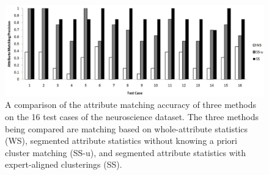 \begin{figure}[tb]
\begin{center}
\includegraphics[width=1.\textwidth]{fig/perf_comp.eps}
\end{center}
\caption[A comparison between methods on the neuroscience dataset]{\label{fig:perf_comp} A comparison of the attribute matching accuracy of three methods on the 16 test cases of the neuroscience dataset. The three methods being compared are matching based on whole-attribute statistics (WS), segmented attribute statistics without knowing a priori cluster matching (SS-u), and segmented attribute statistics with expert-aligned clusterings (SS).}
\end{figure}


